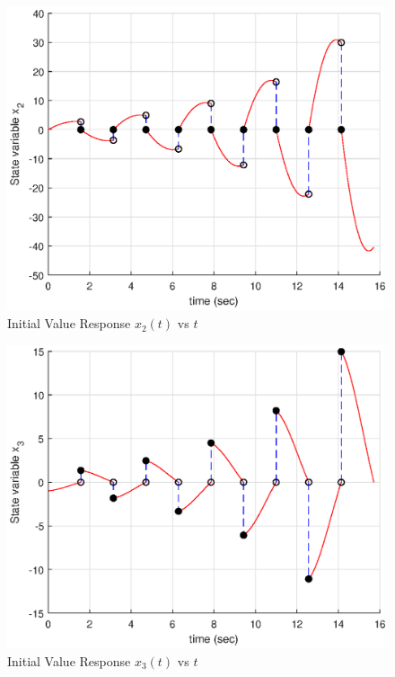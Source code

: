 \documentclass[11pt,a4paper]{article}
\begin{document}
\begin{figure}
\centering
\includegraphics[scale=0.8]{FG11.eps} 
\caption{Initial Value Response $x_2(t)$ vs $t$}
\end{figure}

\begin{figure}
\centering
\includegraphics[scale=0.7]{FG12.eps} 
\caption{Initial Value Response $x_3(t)$ vs $t$}
\end{figure}
\end{document}
